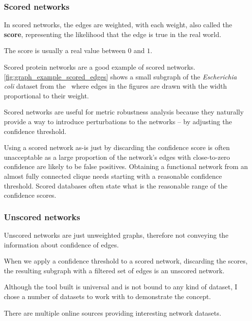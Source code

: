 \subsubsection{Scored networks}\label{sec:scored_networks}

In scored networks, the edges are weighted, with each weight, also called the \textbf{score}, representing the likelihood that the edge is true in the real world.

The score is usually a real value between $0$ and $1$.



Scored protein networks are a good example of scored networks.
\autoref{fig:graph_example_scored_edges} shows a small subgraph of the \textsl{Escherichia coli} dataset from the~ where edges in the figures are drawn with the width proportional to their weight.

Scored networks are useful for metric robustness analysis because they naturally provide a way to introduce perturbations to the networks -- by adjusting the confidence threshold.

Using a scored network as-is just by discarding the confidence score is often unacceptable as a large proportion of the network's edges with close-to-zero confidence are likely to be false positives.
Obtaining a functional network from an almost fully connected clique needs starting with a reasonable confidence threshold.
Scored databases often state what is the reasonable range of the confidence scores.

\subsubsection{Unscored networks}

Unscored networks are just unweighted graphs, therefore not conveying the information about confidence of edges.

When we apply a confidence threshold to a scored network, discarding the scores, the resulting subgraph with a filtered set of edges is an unscored network.

\parspace

Although the \graffs tool built is universal and is not bound to any kind of dataset, I chose a number of datasets to work with to demonstrate the concept.

There are multiple online sources providing interesting network datasets.


